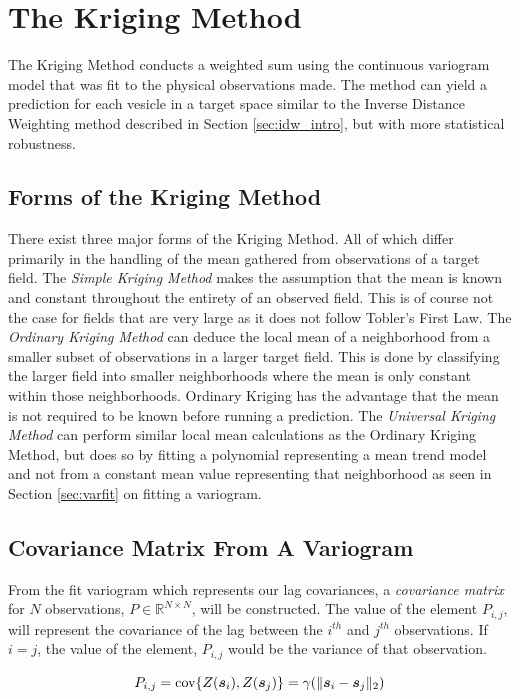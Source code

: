 \documentclass[11pt]{ucthesis}
\newcommand{\vect}[1]{{\it{\boldsymbol{#1}}}}
\begin{document}
\section{The Kriging Method}
The Kriging Method conducts a weighted sum using the continuous variogram model that was fit to the physical observations made. The method can yield a prediction for each vesicle in a target space similar to the Inverse Distance Weighting method described in Section \ref{sec:idw_intro}, but with more statistical robustness.

\subsection{Forms of the Kriging Method}
There exist three major forms of the Kriging Method. All of which differ primarily in the handling of the mean gathered from observations of a target field. The \textit{Simple Kriging Method} makes the assumption that the mean is known and constant throughout the entirety of an observed field. This is of course not the case for fields that are very large as it does not follow Tobler's First Law. The \textit{Ordinary Kriging Method} can deduce the local mean of a neighborhood from a smaller subset of observations in a larger target field. This is done by classifying the larger field into smaller neighborhoods where the mean is only constant within those neighborhoods. Ordinary Kriging has the advantage that the mean is not required to be known before running a prediction. The \textit{Universal Kriging Method} can perform similar local mean calculations as the Ordinary Kriging Method, but does so by fitting a polynomial representing a mean trend model and not from a constant mean value representing that neighborhood \cite{vandergraaf:nnkrig} as seen in Section \ref{sec:varfit} on fitting a variogram.

\subsection{Covariance Matrix From A Variogram} \label{sec:covmat}
From the fit variogram which represents our lag covariances, a \textit{covariance matrix} for $N$ observations, $P \in \mathbb{R}^{N \times N}$, will be constructed. The value of the element $P_{i,j}$, will represent the covariance of the lag between the $i^{th}$ and $j^{th}$ observations. If $i=j$, the value of the element, $P_{i,j}$ would be the variance of that observation. 

\begin{equation}
    P_{i,j} = \text{cov}\{Z(\vect{s}_{i}), Z(\vect{s}_{j})\} = \gamma(\| \vect{s}_i - \vect{s}_j \|_2)
    \label{eq:covvarmatelem}
\end{equation}
\end{document}
